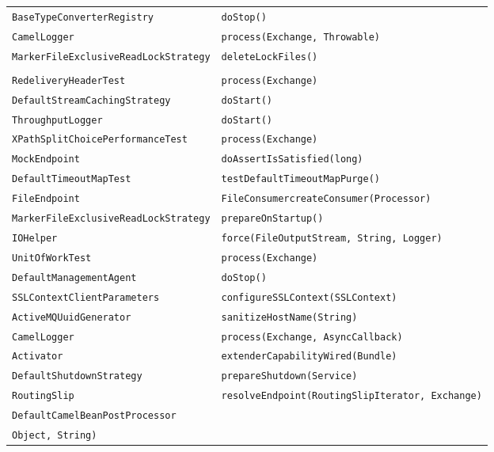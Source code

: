 \begin{center}
\begin{longtable}{ll}
\lstinline/BaseTypeConverterRegistry/&{\lstinline/doStop()/}\\
\lstinline/CamelLogger/&{\lstinline/process(Exchange, Throwable)/}\\
\lstinline/MarkerFileExclusiveReadLockStrategy/&{\lstinline/deleteLockFiles()/}\\
\raisebox{-13pt}{\shortstack{\lstinline/RedeliveryErrorHandlerNonBlocked/-\\\lstinline/RedeliveryHeaderTest/}}&{\lstinline/process(Exchange)/}\\
\lstinline/DefaultStreamCachingStrategy/&{\lstinline/doStart()/}\\
\lstinline/ThroughputLogger/&{\lstinline/doStart()/}\\
\lstinline/XPathSplitChoicePerformanceTest/&{\lstinline/process(Exchange)/}\\
\lstinline/MockEndpoint/&{\lstinline/doAssertIsSatisfied(long)/}\\
\lstinline/DefaultTimeoutMapTest/&{\lstinline/testDefaultTimeoutMapPurge()/}\\
\lstinline/FileEndpoint/&{\lstinline/FileConsumercreateConsumer(Processor)/}\\
\lstinline/MarkerFileExclusiveReadLockStrategy/&{\lstinline/prepareOnStartup()/}\\
\lstinline/IOHelper/&{\lstinline/force(FileOutputStream, String, Logger)/}\\
\lstinline/UnitOfWorkTest/&{\lstinline/process(Exchange)/}\\
\lstinline/DefaultManagementAgent/&{\lstinline/doStop()/}\\
\lstinline/SSLContextClientParameters/&{\lstinline/configureSSLContext(SSLContext)/}\\
\lstinline/ActiveMQUuidGenerator/&{\lstinline/sanitizeHostName(String)/}\\
\lstinline/CamelLogger/&{\lstinline/process(Exchange, AsyncCallback)/}\\
\lstinline/Activator/&{\lstinline/extenderCapabilityWired(Bundle)/}\\
\lstinline/DefaultShutdownStrategy/&{\lstinline/prepareShutdown(Service)/}\\
\lstinline/RoutingSlip/&{\lstinline/resolveEndpoint(RoutingSlipIterator, Exchange)/}\\
\lstinline/DefaultCamelBeanPostProcessor/&\raisebox{-13pt}{\shortstack{\lstinline/setterBeanInjection(Method, String,/\\\lstinline/Object, String)/}}\\

\end{longtable}
\end{center}
